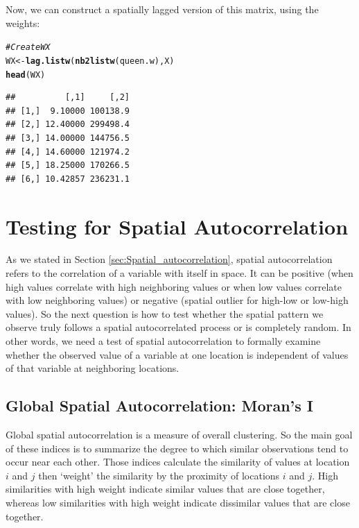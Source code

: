 \documentclass[english,12pt]{book}\usepackage[]{graphicx}\usepackage[]{xcolor}
\makeatletter
\newcommand{\hlcom}[1]{\textcolor[rgb]{0.678,0.584,0.686}{\textit{#1}}}%
\newcommand{\hlstd}[1]{\textcolor[rgb]{0.345,0.345,0.345}{#1}}%
\newcommand{\hlkwb}[1]{\textcolor[rgb]{0.69,0.353,0.396}{#1}}%
\newcommand{\hlkwd}[1]{\textcolor[rgb]{0.737,0.353,0.396}{\textbf{#1}}}%
\newenvironment{kframe}{%
 \def\at@end@of@kframe{}%
 \ifinner\ifhmode%
  \def\at@end@of@kframe{\end{minipage}}%
  \begin{minipage}{\columnwidth}%
 \fi\fi%
 \def\FrameCommand##1{\hskip\@totalleftmargin \hskip-\fboxsep
 \colorbox{shadecolor}{##1}\hskip-\fboxsep
     \hskip-\linewidth \hskip-\@totalleftmargin \hskip\columnwidth}%
 \MakeFramed {\advance\hsize-\width
   \@totalleftmargin\z@ \linewidth\hsize
   \@setminipage}}%
 {\par\unskip\endMakeFramed%
 \at@end@of@kframe}
\newenvironment{knitrout}{}{} %
\makeatother
\begin{document}
Now, we can construct a spatially lagged version of this matrix, using the  weights:

\begin{knitrout}
\color{fgcolor}\begin{kframe}
\begin{alltt}
\hlcom{# Create WX}
\hlstd{WX} \hlkwb{<-} \hlkwd{lag.listw}\hlstd{(}\hlkwd{nb2listw}\hlstd{(queen.w), X)}
\hlkwd{head}\hlstd{(WX)}
\end{alltt}
\begin{verbatim}
##          [,1]     [,2]
## [1,]  9.10000 100138.9
## [2,] 12.40000 299498.4
## [3,] 14.00000 144756.5
## [4,] 14.60000 121974.2
## [5,] 18.25000 170266.5
## [6,] 10.42857 236231.1
\end{verbatim}
\end{kframe}
\end{knitrout}


\section{Testing for Spatial Autocorrelation}

As we stated in Section \ref{sec:Spatial_autocorrelation}, spatial autocorrelation refers to the correlation of a variable with itself in space. It can be positive (when high values correlate with high neighboring values or when low values correlate with low neighboring values) or negative (spatial outlier for high-low or low-high values). So the next question is how to test whether the spatial pattern we observe truly follows a spatial autocorrelated process or is completely random. In other words, we need a test of spatial autocorrelation to formally examine whether the observed value of a variable at one location is independent of values of that variable at neighboring locations.

\subsection{Global Spatial Autocorrelation: Moran's I}\label{sec:moransI}

Global spatial autocorrelation is a measure of overall clustering. So the main goal of these indices is to summarize the degree to which similar observations tend to occur near each other. Those indices calculate the similarity of values at location $i$ and $j$ then `weight' the similarity by the proximity of locations $i$ and $j$. High similarities with high weight indicate similar values that are close together, whereas low similarities with high weight indicate dissimilar values that are close together.
\end{document}
